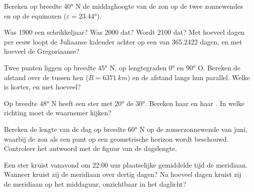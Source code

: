 \begin{exercise}[$\star$]\label{exo:b1:spherical-astronomy:3}
Bereken op breedte \ang{40} N de middaghoogte van de zon op de twee
zonnewendes en op de equinoxen ($\varepsilon = \ang{23.44}$).
\end{exercise}

\begin{exercise}[$\star$]\label{exo:b1:spherical-astronomy:4}
Was 1900 een schrikkeljaar? Was 2000 dat? Wordt 2100 dat? Met hoeveel dagen
per eeuw loopt de Juliaanse kalender achter op een  van 365.2422
dagen, en met hoeveel de Gregoriaanse?
\end{exercise}

\begin{exercise}[$\star\star$]\label{exo:b1:spherical-astronomy:5}
Twee punten liggen op breedte \ang{45} N, op lengtegraden \ang{0} en
\ang{90} O. Bereken de afstand over de  tussen hen
($R = \qty{6371}{km}$) en de afstand langs hun parallel. Welke is korter, en met
hoeveel?
\end{exercise}

\begin{exercise}[$\star\star$]\label{exo:b1:spherical-astronomy:6}
Op breedte \ang{48} N heeft een ster met  \ang{20} de 
\ang{30}. Bereken haar  en haar . In welke richting moet de
waarnemer kijken?
\end{exercise}

\begin{exercise}[$\star\star$]\label{exo:b1:spherical-astronomy:7}
Bereken de lengte van de dag op breedte \ang{60} N op de zomerzonnewende van
juni, waarbij de zon als een punt op een geometrische horizon wordt beschouwd.
Controleer het antwoord met de figuur van de dagslengte.
\end{exercise}

\begin{exercise}[$\star\star$]\label{exo:b1:spherical-astronomy:8}
Een ster kruist vanavond om 22:00 uur plaatselijke gemiddelde tijd de
meridiaan. Wanneer kruist zij de meridiaan over dertig dagen? Na hoeveel dagen
kruist zij de meridiaan op het middaguur, onzichtbaar in het daglicht?
\end{exercise}

